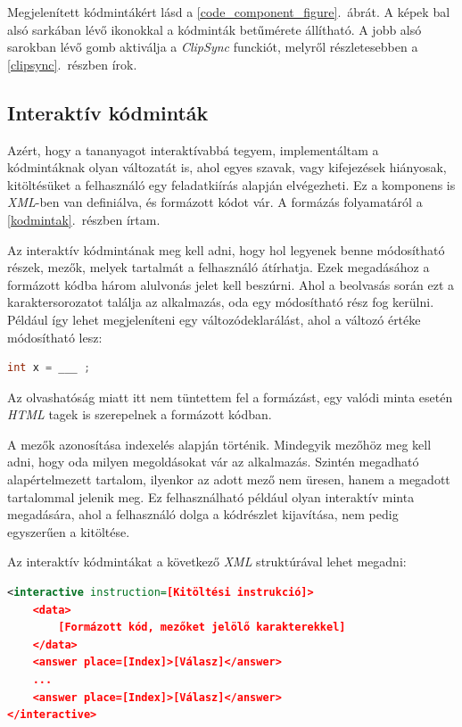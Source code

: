 \documentclass[12pt,a4paper]{article}
\newcommand{\xml}{\textit{XML}\xspace}
\begin{document}
	Megjelenített kódmintákért lásd a \ref{code_component_figure}.\ ábrát. A képek bal alsó sarkában lévő ikonokkal a kódminták betűmérete állítható. A jobb alsó sarokban lévő gomb aktiválja a \textit{ClipSync} funckiót, melyről részletesebben a \ref{clipsync}.\ részben írok.
	
	\subsection{Interaktív kódminták}\label{interaktiv_kodmintak}
	
	Azért, hogy a tananyagot interaktívabbá tegyem, implementáltam a kódmintáknak olyan változatát is, ahol egyes szavak, vagy kifejezések hiányosak, kitöltésüket a felhasználó egy feladatkiírás alapján elvégezheti. Ez a komponens is \xml-ben van definiálva, és formázott kódot vár. A formázás folyamatáról a \ref{kodmintak}.\ részben írtam.
	
	Az interaktív kódmintának meg kell adni, hogy hol legyenek benne módosítható részek, mezők, melyek tartalmát a felhasználó átírhatja. Ezek megadásához a formázott kódba három alulvonás jelet kell beszúrni. Ahol a beolvasás során ezt a karaktersorozatot találja az alkalmazás, oda egy módosítható rész fog kerülni. Például így lehet megjeleníteni egy változódeklarálást, ahol a változó értéke módosítható lesz:
	
	\bigskip
	\begin{lstlisting}[language=Java]
	int x = ___ ;
	\end{lstlisting}  
	\bigskip
	
	Az olvashatóság miatt itt nem tüntettem fel a formázást, egy valódi minta esetén \textit{HTML} tagek is szerepelnek a formázott kódban.
	
	A mezők azonosítása indexelés alapján történik. Mindegyik mezőhöz meg kell adni, hogy oda milyen megoldásokat vár az alkalmazás. Szintén megadható alapértelmezett tartalom, ilyenkor az adott mező nem üresen, hanem a megadott tartalommal jelenik meg. Ez felhasználható például olyan interaktív minta megadására, ahol a felhasználó dolga a kódrészlet kijavítása, nem pedig egyszerűen a kitöltése.
	
	Az interaktív kódmintákat a következő \xml struktúrával lehet megadni:
	
	\bigskip
	\begin{lstlisting}[language=XML]
<interactive instruction=[Kitöltési instrukció]>
	<data>
		[Formázott kód, mezőket jelölő karakterekkel]
	</data>
	<answer place=[Index]>[Válasz]</answer>
	...
	<answer place=[Index]>[Válasz]</answer>
</interactive>
	\end{lstlisting}
	\bigskip
	
\end{document}
